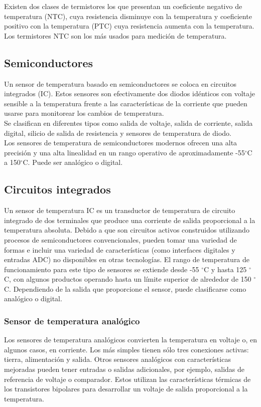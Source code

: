 	Existen dos clases de termistores los que presentan un coeficiente negativo de temperatura (NTC), cuya resistencia disminuye con la temperatura y coeficiente positivo con la temperatura  (PTC) cuya resistencia aumenta con la temperatura. Los termistores NTC son los más usados para medición de temperatura. \cite{omegaTermistor} \cite{unetSensores}
	
	\subsection{Semiconductores}
	Un sensor de temperatura basado en semiconductores se coloca en circuitos integrados (IC). Estos sensores son efectivamente dos diodos idénticos con voltaje sensible a la temperatura frente a las características de la corriente que pueden usarse para monitorear los cambios de temperatura. \cite{elprocusTempSens} \\
	
	Se clasifican en diferentes tipos como salida de voltaje, salida de corriente, salida digital, silicio de salida de resistencia y sensores de temperatura de diodo. \\
	
	Los sensores de temperatura de semiconductores modernos ofrecen una alta precisión y una alta linealidad en un rango operativo de aproximadamente -55$^{\circ}$C a 150$^{\circ}$C. Puede ser analógico o digital. \cite{amethermTemp}
	
			
	\subsection{Circuitos integrados}
	Un sensor de temperatura IC es un transductor de temperatura de circuito integrado de dos terminales que produce una corriente de salida proporcional a la temperatura absoluta. Debido a que son circuitos activos construidos utilizando procesos de semiconductores convencionales, pueden tomar una variedad de formas e incluir una variedad de características (como interfaces digitales y entradas ADC) no disponibles en otras tecnologías. El rango de temperatura de funcionamiento para este tipo de sensores se extiende desde -55 $^{\circ}$C y hasta 125 $^{\circ}$C, con algunos productos operando hasta un límite superior de alrededor de 150 $^{\circ}$C. Dependiendo de la salida que proporcione el sensor, puede clasificarse como analógico o digital. \cite{elprocusTempSens}
	
		\subsubsection{Sensor de temperatura analógico}
		Los sensores de temperatura analógicos convierten la temperatura en voltaje o, en algunos casos, en corriente. Los más simples tienen sólo tres conexiones activas: tierra, alimentación y salida. Otros sensores analógicos con características mejoradas pueden tener entradas o salidas adicionales, por ejemplo, salidas de referencia de voltaje o comparador. Estos utilizan las características térmicas de los transistores bipolares para desarrollar un voltaje de salida proporcional a la temperatura. \cite{omegaCI}
					
